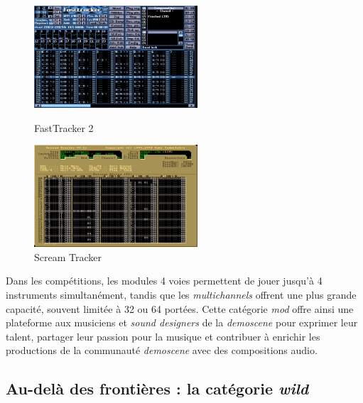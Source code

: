\begin{figure}[h]
  \begin{minipage}[b]{0.45\linewidth}
    \centering
    \includegraphics[width=\linewidth, height=1.5in]{images/demoscene/fasttracker00.png}
    \caption{FastTracker 2}
    \label{fasttracker00}
  \end{minipage}
  \hspace{0.1\linewidth} %
  \begin{minipage}[b]{0.45\linewidth}
    \centering
    \includegraphics[width=\linewidth, height=1.5in]{images/demoscene/screamtracker00.png}
    \caption{Scream Tracker}
    \label{screamtracker00}
  \end{minipage}
\end{figure}


Dans les compétitions, les modules 4 voies permettent de jouer jusqu'à 4 instruments simultanément, tandis que les \textit{multichannels} offrent une plus grande capacité, souvent limitée à 32 ou 64 portées. Cette catégorie \textit{mod} offre ainsi une plateforme aux musiciens et \textit{sound designers} de la \textit{demoscene} pour exprimer leur talent, partager leur passion pour la musique et contribuer à enrichir les productions de la communauté \textit{demoscene} avec des compositions audio.




\subsection*{Au-delà des frontières : la catégorie \textit{wild}}

